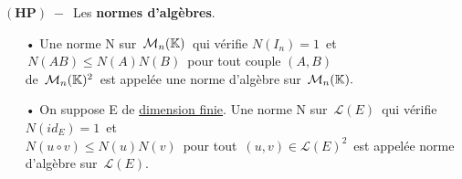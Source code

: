 \(\left(\mathbf{HP}\right)\; -\,\) Les \textbf{normes d'algèbres}.
\begin{itemize}[leftmargin=0.5cm]
    \item[•] Une norme N sur \(\,\mathcal{M}_n(\mathbb{K})\,\) qui vérifie \(N(I_n)=1\,\) et \(\,N(AB)\leq N(A)N(B)\,\) pour tout couple \((A,B)\)\vspace{0.1cm}\\
    de \(\,\mathcal{M}_n(\mathbb{K})^2\,\) est appelée une norme d'algèbre sur \(\,\mathcal{M}_n(\mathbb{K}).\)\vspace{0.2cm}

    \item[•] On suppose E de \underline{dimension finie}. Une norme N sur \(\,\mathscr{L}(E)\,\) qui vérifie \(N(id_E)=1\,\) et\vspace{0.1cm}\\ 
    \(N(u\circ v)\leq N(u)N(v)\,\) pour tout \(\,(u,v)\in\mathscr{L}(E)^2\,\) est appelée norme d'algèbre sur \(\,\mathscr{L}(E)\).
\end{itemize}

\vspace{1.6cm}

